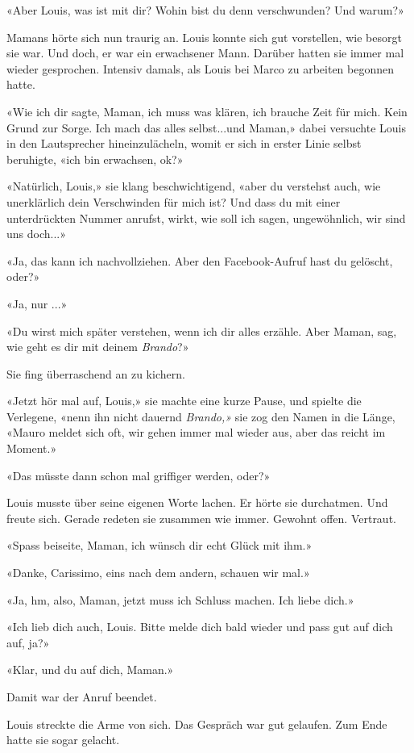 «Aber Louis, was ist mit dir? Wohin bist du denn verschwunden? Und
warum?»

Mamans hörte sich nun traurig an. Louis konnte sich gut vorstellen, wie
besorgt sie war. Und doch, er war ein erwachsener Mann. Darüber hatten
sie immer mal wieder gesprochen. Intensiv damals, als Louis bei Marco zu
arbeiten begonnen hatte.

«Wie ich dir sagte, Maman, ich muss was klären, ich brauche Zeit für
mich. Kein Grund zur Sorge. Ich mach das alles selbst...und Maman,»
dabei versuchte Louis in den Lautsprecher hineinzulächeln, womit er sich
in erster Linie selbst beruhigte, «ich bin erwachsen, ok?»

«Natürlich, Louis,» sie klang beschwichtigend, «aber du verstehst auch,
wie unerklärlich dein Verschwinden für mich ist? Und dass du mit einer
unterdrückten Nummer anrufst, wirkt, wie soll ich sagen, ungewöhnlich,
wir sind uns doch...»

«Ja, das kann ich nachvollziehen. Aber den Facebook-Aufruf hast du
gelöscht, oder?»

«Ja, nur ...»

«Du wirst mich später verstehen, wenn ich dir alles erzähle. Aber Maman,
sag, wie geht es dir mit deinem \emph{Brando}?»

Sie fing überraschend an zu kichern.

«Jetzt hör mal auf, Louis,» sie machte eine kurze Pause, und spielte die
Verlegene, «nenn ihn nicht dauernd \emph{Brando,»} sie zog den Namen in
die Länge, «Mauro meldet sich oft, wir gehen immer mal wieder aus, aber
das reicht im Moment.»

«Das müsste dann schon mal griffiger werden, oder?»

Louis musste über seine eigenen Worte lachen. Er hörte sie durchatmen.
Und freute sich. Gerade redeten sie zusammen wie immer. Gewohnt offen.
Vertraut.

«Spass beiseite, Maman, ich wünsch dir echt Glück mit ihm.»

«Danke, Carissimo, eins nach dem andern, schauen wir mal.»

«Ja, hm, also, Maman, jetzt muss ich Schluss machen. Ich liebe dich.»

«Ich lieb dich auch, Louis. Bitte melde dich bald wieder und pass gut
auf dich auf, ja?»

«Klar, und du auf dich, Maman.»

Damit war der Anruf beendet.

Louis streckte die Arme von sich. Das Gespräch war gut gelaufen. Zum
Ende hatte sie sogar gelacht.

